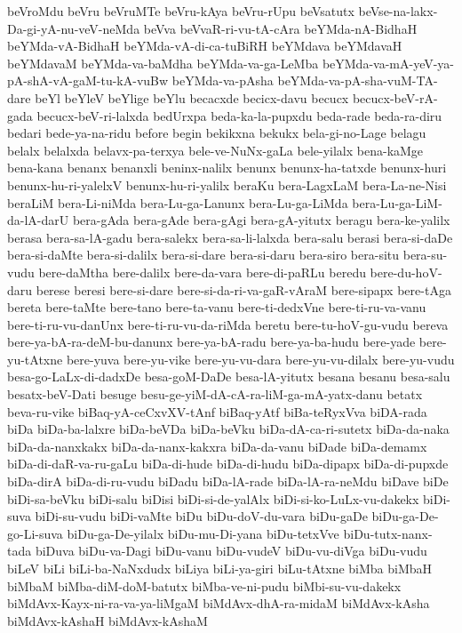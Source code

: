 {beVroMdu
beVru
beVruMTe
beVru-kAya
beVru-rUpu
beVsatutx
beVse-na-lakx-Da-gi-yA-nu-veV-neMda
beVva
beVvaR-ri-vu-tA-cAra
beYMda-nA-BidhaH
beYMda-vA-BidhaH
beYMda-vA-di-ca-tuBiRH
beYMdava
beYMdavaH
beYMdavaM
beYMda-va-baMdha
beYMda-va-ga-LeMba
beYMda-va-mA-yeV-ya-pA-shA-vA-gaM-tu-kA-vuBw
beYMda-va-pAsha
beYMda-va-pA-sha-vuM-TA-dare
beYl
beYleV
beYlige
beYlu
becacxde
becicx-davu
becucx
becucx-beV-rA-gada
becucx-beV-ri-lalxda
bedUrxpa
beda-ka-la-pupxdu
beda-rade
beda-ra-diru
bedari
bede-ya-na-ridu
before
begin
bekikxna
bekukx
bela-gi-no-Lage
belagu
belalx
belalxda
belavx-pa-terxya
bele-ve-NuNx-gaLa
bele-yilalx
bena-kaMge
bena-kana
benanx
benanxli
beninx-nalilx
benunx
benunx-ha-tatxde
benunx-huri
benunx-hu-ri-yalelxV
benunx-hu-ri-yalilx
beraKu
bera-LagxLaM
bera-La-ne-Nisi
beraLiM
bera-Li-niMda
bera-Lu-ga-Lanunx
bera-Lu-ga-LiMda
bera-Lu-ga-LiM-da-lA-darU
bera-gAda
bera-gAde
bera-gAgi
bera-gA-yitutx
beragu
bera-ke-yalilx
berasa
bera-sa-lA-gadu
bera-salekx
bera-sa-li-lalxda
bera-salu
berasi
bera-si-daDe
bera-si-daMte
bera-si-dalilx
bera-si-dare
bera-si-daru
bera-siro
bera-situ
bera-su-vudu
bere-daMtha
bere-dalilx
bere-da-vara
bere-di-paRLu
beredu
bere-du-hoV-daru
berese
beresi
bere-si-dare
bere-si-da-ri-va-gaR-vAraM
bere-sipapx
bere-tAga
bereta
bere-taMte
bere-tano
bere-ta-vanu
bere-ti-dedxVne
bere-ti-ru-va-vanu
bere-ti-ru-vu-danUnx
bere-ti-ru-vu-da-riMda
beretu
bere-tu-hoV-gu-vudu
bereva
bere-ya-bA-ra-deM-bu-danunx
bere-ya-bA-radu
bere-ya-ba-hudu
bere-yade
bere-yu-tAtxne
bere-yuva
bere-yu-vike
bere-yu-vu-dara
bere-yu-vu-dilalx
bere-yu-vudu
besa-go-LaLx-di-dadxDe
besa-goM-DaDe
besa-lA-yitutx
besana
besanu
besa-salu
besatx-beV-Dati
besuge
besu-ge-yiM-dA-cA-ra-liM-ga-mA-yatx-danu
betatx
beva-ru-vike
biBaq-yA-ceCxvXV-tAnf
biBaq-yAtf
biBa-teRyxVva
biDA-rada
biDa
biDa-ba-lalxre
biDa-beVDa
biDa-beVku
biDa-dA-ca-ri-sutetx
biDa-da-naka
biDa-da-nanxkakx
biDa-da-nanx-kakxra
biDa-da-vanu
biDade
biDa-demamx
biDa-di-daR-va-ru-gaLu
biDa-di-hude
biDa-di-hudu
biDa-dipapx
biDa-di-pupxde
biDa-dirA
biDa-di-ru-vudu
biDadu
biDa-lA-rade
biDa-lA-ra-neMdu
biDave
biDe
biDi-sa-beVku
biDi-salu
biDisi
biDi-si-de-yalAlx
biDi-si-ko-LuLx-vu-dakekx
biDi-suva
biDi-su-vudu
biDi-vaMte
biDu
biDu-doV-du-vara
biDu-gaDe
biDu-ga-De-go-Li-suva
biDu-ga-De-yilalx
biDu-mu-Di-yana
biDu-tetxVve
biDu-tutx-nanx-tada
biDuva
biDu-va-Dagi
biDu-vanu
biDu-vudeV
biDu-vu-diVga
biDu-vudu
biLeV
biLi
biLi-ba-NaNxdudx
biLiya
biLi-ya-giri
biLu-tAtxne
biMba
biMbaH
biMbaM
biMba-diM-doM-batutx
biMba-ve-ni-pudu
biMbi-su-vu-dakekx
biMdAvx-Kayx-ni-ra-va-ya-liMgaM
biMdAvx-dhA-ra-midaM
biMdAvx-kAsha
biMdAvx-kAshaH
biMdAvx-kAshaM
}
